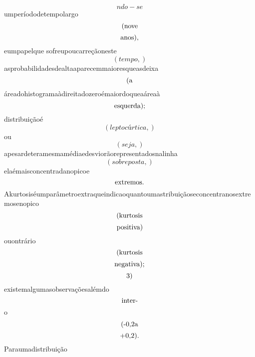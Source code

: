 \documentclass{article}
\begin{document}
\begin{equation}
ndo - se
\end{equation}umperíododetempolargo\begin{equation}
$(nove$
\end{equation}\begin{equation}
$anos),$
\end{equation}eumpapelque sofreupoucarreçãoneste\begin{equation}
\left( tempo,\right)
\end{equation}asprobabilidadesdealtaaparecemmaioresqueasdeixa\begin{equation}
$(a$
\end{equation}áreadohistogramaàdireitadozeroémaiordoqueaáreaà\begin{equation}
$esquerda);$
\end{equation}distribuiçãoé\begin{equation}
\left( leptocúrtica,\right)
\end{equation}ou\begin{equation}
\left( seja,\right)
\end{equation}apesardeteramesmamédiaedesviorãorepresentadosnalinha\begin{equation}
\left( sobreposta,\right)
\end{equation}elaémaisconcentradanopicoe\begin{equation}
$extremos.$
\end{equation}Akurtosiséumparâmetroextraqueindicaoquantoumastribuiçãoseconcentranosextremosenopico\begin{equation}
$(kurtosis$
\end{equation}\begin{equation}
$positiva)$
\end{equation}ouontrário\begin{equation}
$(kurtosis$
\end{equation}\begin{equation}
$negativa);$
\end{equation}\begin{equation}
$3)$
\end{equation}existemalgumasobservaçõesalémdo\begin{equation}
$inter-$
\end{equation}o\begin{equation}
$(-0,2a$
\end{equation}\begin{equation}
$+0,2).$
\end{equation}Paraumadistribuição\begin{equation}

\end{equation}
\end{document}

